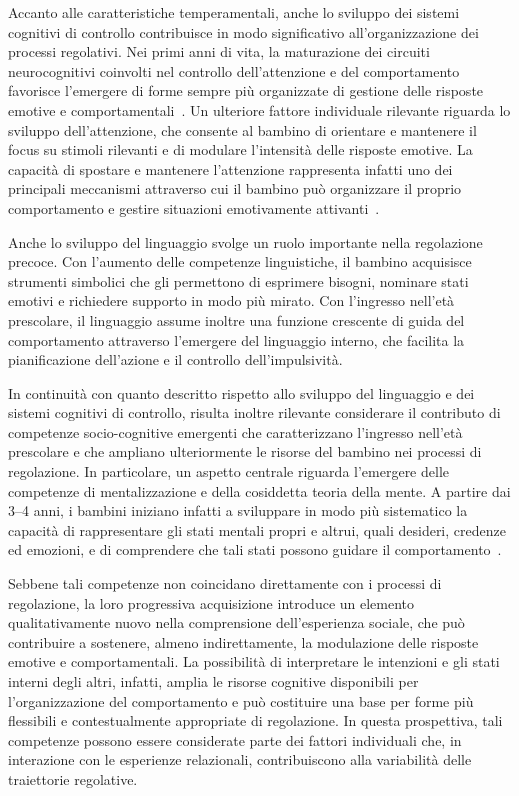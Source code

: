         Accanto alle caratteristiche temperamentali, anche lo sviluppo dei sistemi cognitivi di controllo contribuisce in modo significativo all'organizzazione dei processi regolativi. Nei primi anni di vita, la maturazione dei circuiti neurocognitivi coinvolti nel controllo dell'attenzione e del comportamento favorisce l'emergere di forme sempre più organizzate di gestione delle risposte emotive e comportamentali~\cite{diamond2013,blair2015}. Un ulteriore fattore individuale rilevante riguarda lo sviluppo dell'attenzione, che consente al bambino di orientare e mantenere il focus su stimoli rilevanti e di modulare l'intensità delle risposte emotive. La capacità di spostare e mantenere l'attenzione rappresenta infatti uno dei principali meccanismi attraverso cui il bambino può organizzare il proprio comportamento e gestire situazioni emotivamente attivanti~\cite{posner2000}.

        Anche lo sviluppo del linguaggio svolge un ruolo importante nella regolazione precoce. Con l'aumento delle competenze linguistiche, il bambino acquisisce strumenti simbolici che gli permettono di esprimere bisogni, nominare stati emotivi e richiedere supporto in modo più mirato. Con l'ingresso nell'età prescolare, il linguaggio assume inoltre una funzione crescente di guida del comportamento attraverso l'emergere del linguaggio interno, che facilita la pianificazione dell'azione e il controllo dell'impulsività.

        In continuità con quanto descritto rispetto allo sviluppo del linguaggio e dei sistemi cognitivi di controllo, risulta inoltre rilevante considerare il contributo di competenze socio-cognitive emergenti che caratterizzano l'ingresso nell'età prescolare e che ampliano ulteriormente le risorse del bambino nei processi di regolazione. In particolare, un aspetto centrale riguarda l'emergere delle competenze di mentalizzazione e della cosiddetta teoria della mente. A partire dai 3--4 anni, i bambini iniziano infatti a sviluppare in modo più sistematico la capacità di rappresentare gli stati mentali propri e altrui, quali desideri, credenze ed emozioni, e di comprendere che tali stati possono guidare il comportamento~\cite{wellman2001,wellman2014}.

        Sebbene tali competenze non coincidano direttamente con i processi di regolazione, la loro progressiva acquisizione introduce un elemento qualitativamente nuovo nella comprensione dell'esperienza sociale, che può contribuire a sostenere, almeno indirettamente, la modulazione delle risposte emotive e comportamentali. La possibilità di interpretare le intenzioni e gli stati interni degli altri, infatti, amplia le risorse cognitive disponibili per l'organizzazione del comportamento e può costituire una base per forme più flessibili e contestualmente appropriate di regolazione. In questa prospettiva, tali competenze possono essere considerate parte dei fattori individuali che, in interazione con le esperienze relazionali, contribuiscono alla variabilità delle traiettorie regolative.

